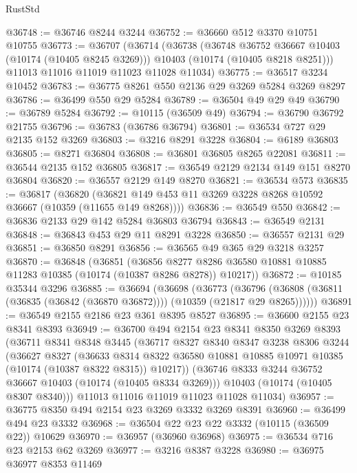 \begin{lexlean}{RustStd}
\begin{coremodule}
@36748 := @36746 @8244 @3244
@36752 := @36660 @512 @3370 @10751 @10755
@36773 := @36707
    (@36714
      (@36738
        (@36748 @36752 @36667 @10403 (@10174 (@10405 @8245 @3269)))
        @10403
        (@10174 (@10405 @8218 @8251)))
      @11013
      @11016
      @11019
      @11023
      @11028
      @11034)
@36775 := @36517 @3234 @10452
@36783 := @36775 @8261 @550 @2136 @29 @3269 @5284 @3269 @8297
@36786 := @36499 @550 @29 @5284
@36789 := @36504 @49 @29 @49
@36790 := @36789 @5284
@36792 := @10115 (@36509 @49)
@36794 := @36790 @36792 @21755
@36796 := @36783 (@36786 @36794)
@36801 := @36534 @727 @29 @2135 @152 @3269
@36803 := @3216 @8291 @3228
@36804 := @6189 @36803
@36805 := @8271 @36804
@36808 := @36801 @36805 @8265 @22081
@36811 := @36544 @2135 @152 @36805
@36817 := @36549 @2129 @2134 @149 @151 @8270 @36804
@36820 := @36557 @2129 @149 @8270
@36821 := @36534 @573
@36835 := @36817
    (@36820 (@36821 @149 @453 @11 @3269 @3228 @8268 @10592 @36667 (@10359 (@11655 @149 @8268))))
@36836 := @36549 @550
@36842 := @36836 @2133 @29 @142 @5284 @36803 @36794
@36843 := @36549 @2131
@36848 := @36843 @453 @29 @11 @8291 @3228
@36850 := @36557 @2131 @29
@36851 := @36850 @8291
@36856 := @36565 @49 @365 @29 @3218 @3257
@36870 := @36848
    (@36851
      (@36856 @8277 @8286 @36580 @10881 @10885 @11283 @10385 (@10174 (@10387 @8286 @8278)) @10217))
@36872 := @10185 @35344 @3296
@36885 := @36694
    (@36698
      (@36773
        (@36796 (@36808 (@36811 (@36835 (@36842 (@36870 @36872)))) (@10359 (@21817 @29 @8265))))))
@36891 := @36549 @2155 @2186 @23 @361 @8395 @8527
@36895 := @36600 @2155 @23 @8341 @8393
@36949 := @36700
    @494
    @2154
    @23
    @8341
    @8350
    @3269
    @8393
    (@36711
      @8341
      @8348
      @3445
      (@36717
        @8327
        @8340
        @8347
        @3238
        @8306
        @3244
        (@36627
          @8327
          (@36633
            @8314
            @8322
            @36580
            @10881
            @10885
            @10971
            @10385
            (@10174 (@10387 @8322 @8315))
            @10217))
        (@36746 @8333 @3244 @36752 @36667 @10403 (@10174 (@10405 @8334 @3269)))
        @10403
        (@10174 (@10405 @8307 @8340)))
      @11013
      @11016
      @11019
      @11023
      @11028
      @11034)
@36957 := @36775 @8350 @494 @2154 @23 @3269 @3332 @3269 @8391
@36960 := @36499 @494 @23 @3332
@36968 := @36504 @22 @23 @22 @3332 (@10115 (@36509 @22)) @10629
@36970 := @36957 (@36960 @36968)
@36975 := @36534 @716 @23 @2153 @62 @3269
@36977 := @3216 @8387 @3228
@36980 := @36975 @36977 @8353 @11469

\end{coremodule}
\end{lexlean}
